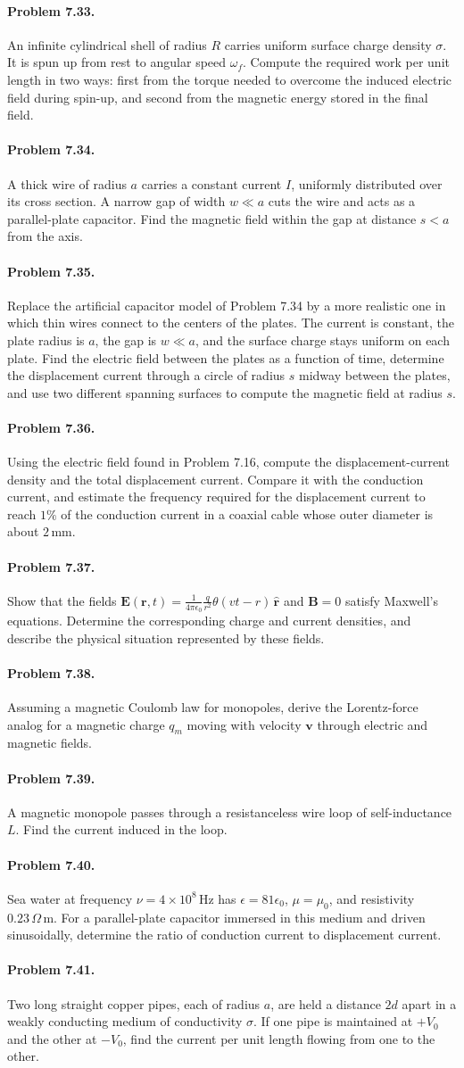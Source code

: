 \documentclass{aa}
\newcommand{\problemstatement}[2]{%
\paragraph{Problem #1.}#2\par\medskip
}
\begin{document}
\problemstatement{7.33}{An infinite cylindrical shell of radius \(R\) carries uniform surface charge density \(\sigma\). It is spun up from rest to angular speed \(\omega_f\). Compute the required work per unit length in two ways: first from the torque needed to overcome the induced electric field during spin-up, and second from the magnetic energy stored in the final field.}
\problemstatement{7.34}{A thick wire of radius \(a\) carries a constant current \(I\), uniformly distributed over its cross section. A narrow gap of width \(w\ll a\) cuts the wire and acts as a parallel-plate capacitor. Find the magnetic field within the gap at distance \(s<a\) from the axis.}
\problemstatement{7.35}{Replace the artificial capacitor model of Problem 7.34 by a more realistic one in which thin wires connect to the centers of the plates. The current is constant, the plate radius is \(a\), the gap is \(w\ll a\), and the surface charge stays uniform on each plate. Find the electric field between the plates as a function of time, determine the displacement current through a circle of radius \(s\) midway between the plates, and use two different spanning surfaces to compute the magnetic field at radius \(s\).}
\problemstatement{7.36}{Using the electric field found in Problem 7.16, compute the displacement-current density and the total displacement current. Compare it with the conduction current, and estimate the frequency required for the displacement current to reach \(1\%\) of the conduction current in a coaxial cable whose outer diameter is about \(2\,\mathrm{mm}\).}
\problemstatement{7.37}{Show that the fields \( \mathbf E(\mathbf r,t)=\frac{1}{4\pi\epsilon_0}\frac{q}{r^2}\theta(vt-r)\,\hat{\mathbf r}\) and \(\mathbf B=0\) satisfy Maxwell's equations. Determine the corresponding charge and current densities, and describe the physical situation represented by these fields.}
\problemstatement{7.38}{Assuming a magnetic Coulomb law for monopoles, derive the Lorentz-force analog for a magnetic charge \(q_m\) moving with velocity \(\mathbf v\) through electric and magnetic fields.}
\problemstatement{7.39}{A magnetic monopole passes through a resistanceless wire loop of self-inductance \(L\). Find the current induced in the loop.}
\problemstatement{7.40}{Sea water at frequency \(\nu=4\times 10^8\,\mathrm{Hz}\) has \(\epsilon=81\epsilon_0\), \(\mu=\mu_0\), and resistivity \(0.23\,\Omega\,\mathrm m\). For a parallel-plate capacitor immersed in this medium and driven sinusoidally, determine the ratio of conduction current to displacement current.}
\problemstatement{7.41}{Two long straight copper pipes, each of radius \(a\), are held a distance \(2d\) apart in a weakly conducting medium of conductivity \(\sigma\). If one pipe is maintained at \(+V_0\) and the other at \(-V_0\), find the current per unit length flowing from one to the other.}
\end{document}
